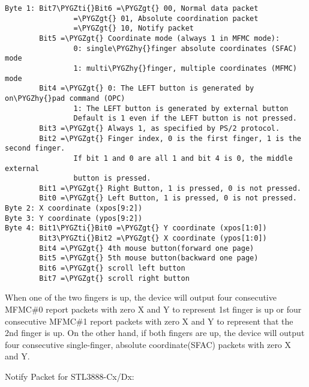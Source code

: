 \documentclass[a4paper,8pt,english]{sphinxmanual}
\def\PYGZgt{\char`\>}
\def\PYGZhy{\char`\-}
\def\PYGZti{\char`\~}
\begin{document}
\begin{Verbatim}[commandchars=\\\{\}]
Byte 1: Bit7\PYGZti{}Bit6 =\PYGZgt{} 00, Normal data packet
                =\PYGZgt{} 01, Absolute coordination packet
                =\PYGZgt{} 10, Notify packet
        Bit5 =\PYGZgt{} Coordinate mode (always 1 in MFMC mode):
                0: single\PYGZhy{}finger absolute coordinates (SFAC) mode
                1: multi\PYGZhy{}finger, multiple coordinates (MFMC) mode
        Bit4 =\PYGZgt{} 0: The LEFT button is generated by on\PYGZhy{}pad command (OPC)
                1: The LEFT button is generated by external button
                Default is 1 even if the LEFT button is not pressed.
        Bit3 =\PYGZgt{} Always 1, as specified by PS/2 protocol.
        Bit2 =\PYGZgt{} Finger index, 0 is the first finger, 1 is the second finger.
                If bit 1 and 0 are all 1 and bit 4 is 0, the middle external
                button is pressed.
        Bit1 =\PYGZgt{} Right Button, 1 is pressed, 0 is not pressed.
        Bit0 =\PYGZgt{} Left Button, 1 is pressed, 0 is not pressed.
Byte 2: X coordinate (xpos[9:2])
Byte 3: Y coordinate (ypos[9:2])
Byte 4: Bit1\PYGZti{}Bit0 =\PYGZgt{} Y coordinate (xpos[1:0])
        Bit3\PYGZti{}Bit2 =\PYGZgt{} X coordinate (ypos[1:0])
        Bit4 =\PYGZgt{} 4th mouse button(forward one page)
        Bit5 =\PYGZgt{} 5th mouse button(backward one page)
        Bit6 =\PYGZgt{} scroll left button
        Bit7 =\PYGZgt{} scroll right button
\end{Verbatim}

When one of the two fingers is up, the device will output four consecutive
MFMC\#0 report packets with zero X and Y to represent 1st finger is up or
four consecutive MFMC\#1 report packets with zero X and Y to represent that
the 2nd finger is up.  On the other hand, if both fingers are up, the device
will output four consecutive single-finger, absolute coordinate(SFAC) packets
with zero X and Y.

Notify Packet for STL3888-Cx/Dx:
\end{document}
